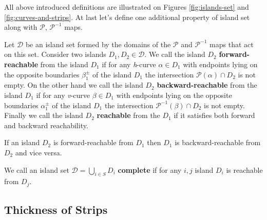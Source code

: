 All above introduced definitions are illustrated on Figures \ref{fig:islands-set} and \ref{fig:curves-and-strips}.
At last let's define one additional property of island set along with $\mathcal{P}$, $\mathcal{P}^{-1}$ maps.

\begin{definition}
	Let $\mathcal{D}$ be an island set formed by the domains of the $\mathcal{P}$ and $\mathcal{P}^{-1}$ maps that act on this set.
	Consider two islands $D_1, D_2 \in \mathcal{D}$.
	We call the island $D_2$ {\bf forward-reachable} from the island $D_1$ if for any \emph{h}-curve $\alpha \in D_1$ with endpoints lying on the opposite boundaries $\beta_1^{\pm}$ of the island $D_1$ the intersection $\mathcal{P}(\alpha) \cap D_2$ is not empty.
	On the other hand we call the island $D_2$ {\bf backward-reachable} from the island $D_1$ if for any \emph{v}-curve $\beta \in D_1$ with endpoints lying on the opposite boundaries $\alpha_1^{\pm}$ of the island $D_1$ the intersection $\mathcal{P}^{-1}(\beta) \cap D_2$ is not empty.
	Finally we call the island $D_2$ {\bf reachable} from the $D_1$ if it satisfies both forward and backward reachability.
\end{definition}

\begin{remark}
	If an island $D_2$ is forward-reachable from $D_1$ then $D_1$ is backward-reachable from $D_2$ and vice versa.
\end{remark}

\begin{definition}
	We call an island set $\mathcal{D} = \bigcup_{i \in S} D_i$ {\bf complete} if for any $i, j$ island $D_i$ is reachable from $D_j$.
\label{def:complete-island-set}
\end{definition}

\subsection{Thickness of Strips}

